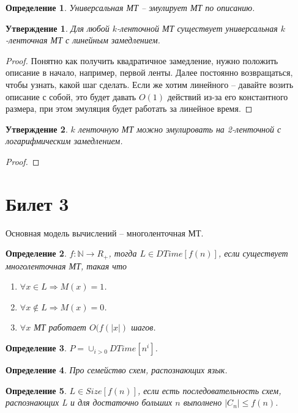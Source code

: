 \documentclass[12pt, letterpaper]{article}
\newtheorem{prop}{Утверждение}[section]
\newtheorem{defi}{Определение}[section]
\begin{document}
\begin{defi}
Универсальная МТ -- эмулирует МТ по описанию.
\end{defi}

\begin{prop}
Для любой $k$-ленточной МТ существует универсальная $k$-ленточная МТ с линейным замедлением.
\end{prop}
\begin{proof}
Понятно как получить квадратичное замедление, нужно положить описание в начало, например, первой ленты. Далее постоянно возвращаться, чтобы узнать, какой шаг сделать. Если же хотим линейного -- давайте возить описание с собой, это будет давать $O(1)$ действий из-за его константного размера, при этом эмуляция будет работать за линейное время.
\end{proof}

\begin{prop}
$k$ ленточную МТ можно эмулировать на 2-ленточной с логарифмическим замедлением.
\end{prop}
\begin{proof}


\end{proof}


\section{Билет 3}
Основная модель вычислений -- многоленточная МТ. 
\begin{defi}
$f : \mathbb{N} \rightarrow R_{+}$, тогда $L \in DTime[f(n)]$, если 
существует многоленточная МТ, такая что
\begin{enumerate}
\item $\forall x \in L \Rightarrow M(x) = 1$.
\item $\forall x \notin L \Rightarrow M(x) = 0$.
\item $\forall x$ МТ работает $O(f(|x|)$ шагов.
\end{enumerate} 
\end{defi} 

\begin{defi}
$P = \cup_{i>0} DTime[n^i]$.
\end{defi}

\begin{defi}
Про семейство схем, распознающих язык.
\end{defi}

\begin{defi}
$L \in Size[f(n)]$, если есть последовательность схем, распознающих L и для достаточно больших $n$ выполнено $|C_n| \leq f(n)$.
\end{defi}
\end{document}
